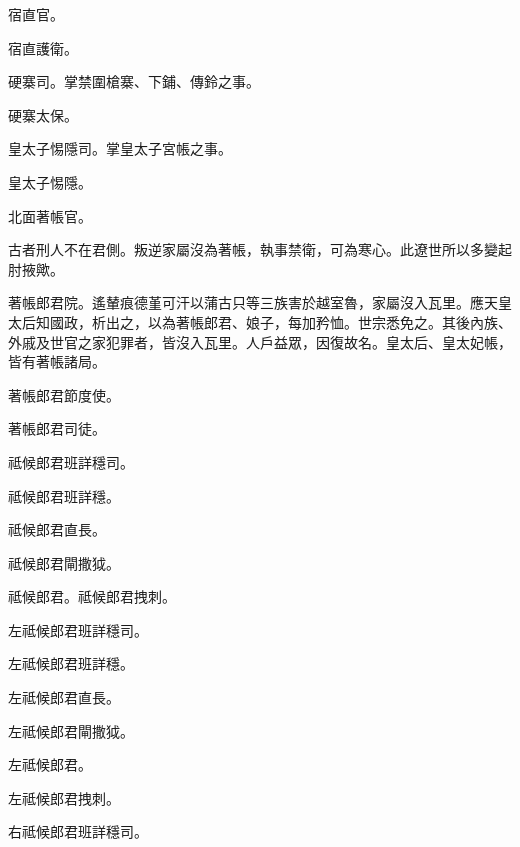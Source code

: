 \begin{pinyinscope}
 宿直官。



 宿直護衛。



 硬寨司。掌禁圍槍寨、下鋪、傳鈴之事。



 硬寨太保。



 皇太子惕隱司。掌皇太子宮帳之事。



 皇太子惕隱。



 北面著帳官。



 古者刑人不在君側。叛逆家屬沒為著帳，執事禁衛，可為寒心。此遼世所以多變起肘掖歟。



 著帳郎君院。遙輦痕德堇可汗以蒲古只等三族害於越室魯，家屬沒入瓦里。應天皇太后知國政，析出之，以為著帳郎君、娘子，每加矜恤。世宗悉免之。其後內族、外戚及世官之家犯罪者，皆沒入瓦里。人戶益眾，因復故名。皇太后、皇太妃帳，皆有著帳諸局。



 著帳郎君節度使。



 著帳郎君司徒。



 祗候郎君班詳穩司。



 祗候郎君班詳穩。



 祗候郎君直長。



 祗候郎君閘撒狘。



 祗候郎君。祗候郎君拽刺。



 左祗候郎君班詳穩司。



 左祗候郎君班詳穩。



 左祗候郎君直長。



 左祗候郎君閘撒狘。



 左祗候郎君。



 左祗候郎君拽刺。



 右祗候郎君班詳穩司。




\end{pinyinscope}
